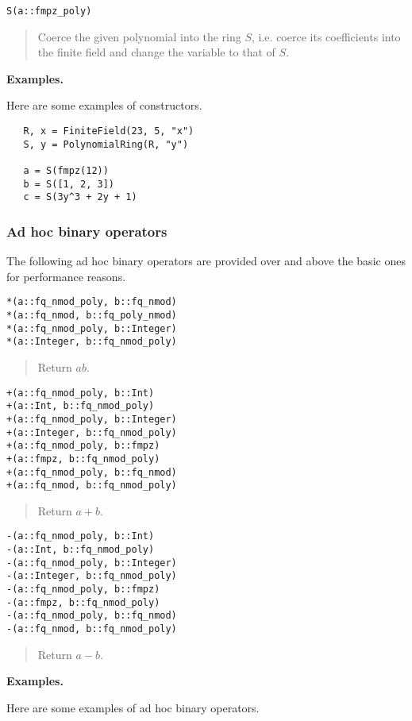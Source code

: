 \documentclass[a4paper,10pt]{article}
\newcommand{\desc}[1]{\vspace{-3mm}\begin{quote}#1\end{quote}}
\begin{document}
{{\begin{lstlisting}
S(a::fmpz_poly)
\end{lstlisting}

\desc{Coerce the given polynomial into the ring $S$, i.e. coerce its coefficients
into the finite field and change the variable to that of $S$.}

\textbf{Examples.}

Here are some examples of constructors.

\begin{lstlisting}
   R, x = FiniteField(23, 5, "x")
   S, y = PolynomialRing(R, "y")

   a = S(fmpz(12))
   b = S([1, 2, 3])
   c = S(3y^3 + 2y + 1)
\end{lstlisting}

\subsubsection{Ad hoc binary operators}

The following ad hoc binary operators are provided over and above the basic ones
for performance reasons.

\begin{lstlisting}
*(a::fq_nmod_poly, b::fq_nmod)
*(a::fq_nmod, b::fq_poly_nmod)
*(a::fq_nmod_poly, b::Integer)
*(a::Integer, b::fq_nmod_poly)
\end{lstlisting}

\desc{Return $ab$.}

\begin{lstlisting}
+(a::fq_nmod_poly, b::Int)
+(a::Int, b::fq_nmod_poly)
+(a::fq_nmod_poly, b::Integer)
+(a::Integer, b::fq_nmod_poly)
+(a::fq_nmod_poly, b::fmpz)
+(a::fmpz, b::fq_nmod_poly)
+(a::fq_nmod_poly, b::fq_nmod)
+(a::fq_nmod, b::fq_nmod_poly)
\end{lstlisting}

\desc{Return $a + b$.}

\begin{lstlisting}
-(a::fq_nmod_poly, b::Int)
-(a::Int, b::fq_nmod_poly)
-(a::fq_nmod_poly, b::Integer)
-(a::Integer, b::fq_nmod_poly)
-(a::fq_nmod_poly, b::fmpz)
-(a::fmpz, b::fq_nmod_poly)
-(a::fq_nmod_poly, b::fq_nmod)
-(a::fq_nmod, b::fq_nmod_poly)
\end{lstlisting}

\desc{Return $a - b$.}

\textbf{Examples.}

Here are some examples of ad hoc binary operators.

}}
\end{document}

